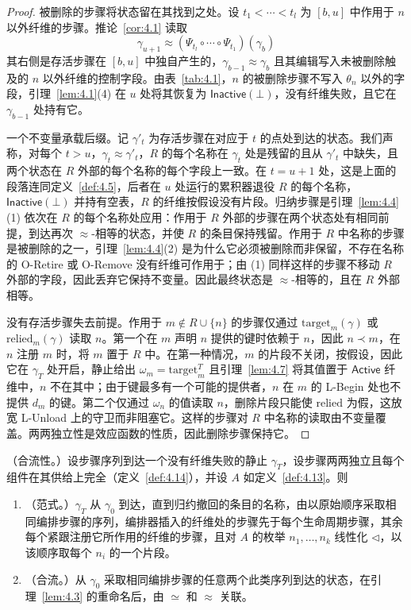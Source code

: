 \begin{proof}
被删除的步骤将状态留在其找到之处。设 $t_1 < \cdots < t_l$ 为 $[b, u]$ 中作用于 $n$ 以外纤维的步骤。推论~\ref{cor:4.1} 读取
\[
\gamma_{u+1} \approx (\Psi_{t_l} \circ \cdots \circ \Psi_{t_1})(\gamma_b)
\]
其右侧是存活步骤在 $[b, u]$ 中独自产生的，$\gamma_{b-1} \approx \gamma_b$ 且其编辑写入未被删除触及的 $n$ 以外纤维的控制字段。由表~\ref{tab:4.1}，$n$ 的被删除步骤不写入 $\theta_n$ 以外的字段，引理~\ref{lem:4.1}(4) 在 $u$ 处将其恢复为 $\mathsf{Inactive}(\bot)$，没有纤维失败，且它在 $\gamma_{b-1}$ 处持有它。

一个不变量承载后缀。记 $\gamma'_t$ 为存活步骤在对应于 $t$ 的点处到达的状态。我们声称，对每个 $t > u$，$\gamma_t \approx \gamma'_t$，$R$ 的每个名称在 $\gamma_t$ 处是残留的且从 $\gamma'_t$ 中缺失，且两个状态在 $R$ 外部的每个名称的每个字段上一致。在 $t = u + 1$ 处，这是上面的段落连同定义~\ref{def:4.5}，后者在 $u$ 处运行的累积器退役 $R$ 的每个名称，$\mathsf{Inactive}(\bot)$ 并持有空表，$R$ 的纤维按假设没有片段。归纳步骤是引理~\ref{lem:4.4}(1) 依次在 $R$ 的每个名称处应用：作用于 $R$ 外部的步骤在两个状态处有相同前提，到达再次 $\approx$-相等的状态，并使 $R$ 的条目保持残留。作用于 $R$ 中名称的步骤是被删除的之一，引理~\ref{lem:4.4}(2) 是为什么它必须被删除而非保留，不存在名称的 O-Retire 或 O-Remove 没有纤维可作用于；由 (1) 同样这样的步骤不移动 $R$ 外部的字段，因此丢弃它保持不变量。因此最终状态是 $\approx$-相等的，且在 $R$ 外部相等。

没有存活步骤失去前提。作用于 $m \notin R \cup \{n\}$ 的步骤仅通过 $\mathrm{target}_m(\gamma)$ 或 $\mathrm{relied}_m(\gamma)$ 读取 $n$。第一个在 $m$ 声明 $n$ 提供的键时依赖于 $n$，因此 $n \prec m$，在 $n$ 注册 $m$ 时，将 $m$ 置于 $R$ 中。在第一种情况，$m$ 的片段不关闭，按假设，因此它在 $\gamma_T$ 处开启，静止给出 $\omega_m = \mathrm{target}^T_m$ 且引理~\ref{lem:4.7} 将其值置于 $\mathsf{Active}$ 纤维中，$n$ 不在其中；由于键最多有一个可能的提供者，$n$ 在 $m$ 的 L-Begin 处也不提供 $d_m$ 的键。第二个仅通过 $\omega_n$ 的值读取 $n$，删除片段只能使 $\mathrm{relied}$ 为假，这放宽 L-Unload 上的守卫而非阻塞它。这样的步骤对 $R$ 中名称的读取由不变量覆盖。两两独立性是效应函数的性质，因此删除步骤保持它。
\end{proof}

\begin{theorem}\label{thm:4.11}
（合流性。）设步骤序列到达一个没有纤维失败的静止 $\gamma_T$，设步骤两两独立且每个组件在其供给上完全（定义~\ref{def:4.14}），并设 $A$ 如定义~\ref{def:4.13}。则
\begin{enumerate}
\item （范式。）$\gamma_T$ 从 $\gamma_0$ 到达，直到归约撤回的条目的名称，由以原始顺序采取相同编排步骤的序列，编排器插入的纤维处的步骤先于每个生命周期步骤，其余每个紧跟注册它所作用的纤维的步骤，且对 $A$ 的枚举 $n_1, \ldots, n_k$ 线性化 $\triangleleft$，以该顺序取每个 $n_i$ 的一个片段。
\item （合流。）从 $\gamma_0$ 采取相同编排步骤的任意两个此类序列到达的状态，在引理~\ref{lem:4.3} 的重命名后，由 $\simeq$ 和 $\approx$ 关联。
\end{enumerate}
\end{theorem}

